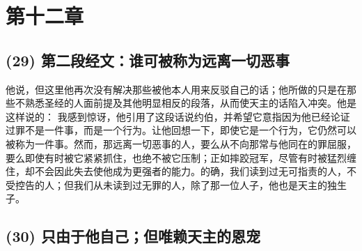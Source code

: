 \section{第十二章}


\subsection{(29) 第二段经文：谁可被称为远离一切恶事}

他说，但这里他再次没有解决那些被他本人用来反驳自己的话；他所做的只是在那些不熟悉圣经的人面前提及其他明显相反的段落，从而使天主的话陷入冲突。他是这样说的： 我感到惊讶，他引用了这段话说约伯，并希望它意指因为他已经论证过罪不是一件事，而是一个行为。让他回想一下，即使它是一个行为，它仍然可以被称为一件事。然而，那远离一切恶事的人，要么从不向那常与他同在的罪屈服，要么即使有时被它紧紧抓住，也绝不被它压制；正如摔跤冠军，尽管有时被猛烈缠住，却不会因此失去使他成为更强者的能力。的确，我们读到过无可指责的人，不受控告的人；但我们从未读到过无罪的人，除了那一位人子，他也是天主的独生子。\par


\subsection{(30) 只由于他自己；但唯赖天主的恩宠}

